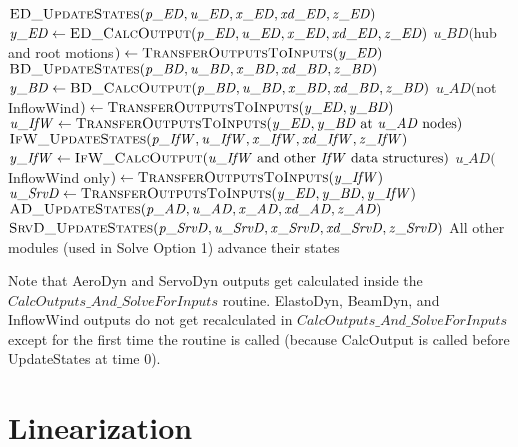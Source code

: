\documentclass[10pt,letterpaper,oneside,notitlepage]{article}
\begin{document}
\begin{algorithmic}[1]
\State $\Call{ED\_UpdateStates}{\mathit{p\_ED},\mathit{u\_ED},\mathit{x\_ED},\mathit{xd\_ED},\mathit{z\_ED}}$
\State $\mathit{y\_ED} \gets \Call{ED\_CalcOutput}{\mathit{p\_ED},\mathit{u\_ED},\mathit{x\_ED},\mathit{xd\_ED},\mathit{z\_ED}}$
\State
\State $\mathit{u\_BD}($hub and root motions$) \gets \Call{TransferOutputsToInputs}{\mathit{y\_ED}}$
\State $\Call{BD\_UpdateStates}{\mathit{p\_BD},\mathit{u\_BD},\mathit{x\_BD},\mathit{xd\_BD},\mathit{z\_BD}}$
\State $\mathit{y\_BD} \gets \Call{BD\_CalcOutput}{\mathit{p\_BD},\mathit{u\_BD},\mathit{x\_BD},\mathit{xd\_BD},\mathit{z\_BD}}$
\State
\State $\mathit{u\_AD}($not InflowWind$) \gets \Call{TransferOutputsToInputs}{\mathit{y\_ED},\mathit{y\_BD}}$
\State $\mathit{u\_IfW} \gets \Call{TransferOutputsToInputs}{\mathit{y\_ED},\mathit{y\_BD}$ at $\mathit{u\_AD}$ nodes$}$
\State $\Call{IfW\_UpdateStates}{\mathit{p\_IfW},\mathit{u\_IfW},\mathit{x\_IfW},\mathit{xd\_IfW},\mathit{z\_IfW}}$
\State $\mathit{y\_IfW} \gets \Call{IfW\_CalcOutput}{\mathit{u\_IfW}$ and other $\mathit{IfW}$ data structures$}$
\State
\State $\mathit{u\_AD}($InflowWind only$) \gets \Call{TransferOutputsToInputs}{\mathit{y\_IfW}}$
\State $\mathit{u\_SrvD} \gets \Call{TransferOutputsToInputs}{\mathit{y\_ED},\mathit{y\_BD},\mathit{y\_IfW}}$
\State $\Call{AD\_UpdateStates}{\mathit{p\_AD},\mathit{u\_AD},\mathit{x\_AD},\mathit{xd\_AD},\mathit{z\_AD}}$
\State $\Call{SrvD\_UpdateStates}{\mathit{p\_SrvD},\mathit{u\_SrvD},\mathit{x\_SrvD},\mathit{xd\_SrvD},\mathit{z\_SrvD}}$
\State
\State All other modules (used in Solve Option 1) advance their states
\EndProcedure
\end{algorithmic}

Note that AeroDyn and ServoDyn outputs get calculated inside the ${CalcOutputs\_And\_SolveForInputs}$ routine. ElastoDyn, BeamDyn, and
InflowWind outputs do not get recalculated in ${CalcOutputs\_And\_SolveForInputs}$ except for the first time the routine is called
(because CalcOutput is called before UpdateStates at time 0).



\section {Linearization}
\end{document}
